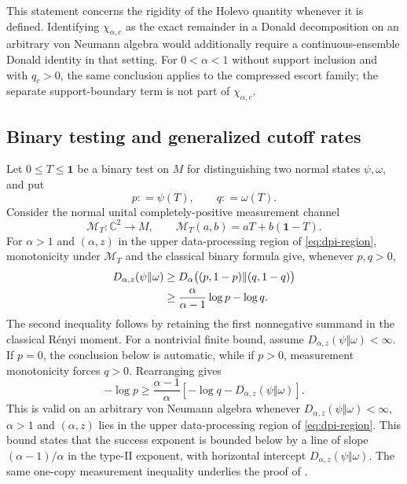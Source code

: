 \documentclass[12pt]{article}
\numberwithin{equation}{section}
\theoremstyle{definition}
\theoremstyle{remark}
\newcommand{\one}{\mathbf 1}
\newcommand{\?}{\overset{?}{=}}
\newcommand{\defeq}{\mathrel{\mathop:}=}
\begin{document}
This statement concerns the rigidity of the Holevo quantity whenever it is
defined.  Identifying \(\chi_{\alpha,c}\) as the exact remainder in a Donald
decomposition on an arbitrary von Neumann algebra would additionally require
a continuous-ensemble Donald identity in that setting.  For
\(0<\alpha<1\) without support inclusion and with \(q_c>0\), the same conclusion applies to the
compressed escort family; the separate support-boundary term is not part of
\(\chi_{\alpha,c}\).
 

\subsection{Binary testing and generalized cutoff rates}
\label{subsec:binary-testing}
Let $0\leq T\leq\one$ be a binary test on $M$ for distinguishing two
normal states $\psi,\omega$, and put
\begin{equation}
  p\defeq \psi(T),\qquad q\defeq \omega(T).
\end{equation}
Consider the normal unital completely-positive measurement channel
\begin{equation}
    \mathcal{M}_T:\mathbb{C}^2\to M,\qquad \mathcal{M}_T(a,b)=aT+b(\one-T).
\end{equation}
For $\alpha>1$ and $(\alpha,z)$ in the upper data-processing region of
\eqref{eq:dpi-region}, monotonicity under $\mathcal{M}_T$ and the classical binary
formula give, whenever $p,q>0$,
\begin{align}
  D_{\alpha,z}(\psi\Vert\omega)
  &\geq D_\alpha\bigl((p,1-p)\Vert(q,1-q)\bigr)\notag\\
  &\geq\frac{\alpha}{\alpha-1}\log p-\log q.
  \label{eq:one-shot-testing-derivation}
\end{align}
The second inequality follows by retaining the first nonnegative summand
in the classical R\'enyi moment.  For a nontrivial finite bound, assume
$D_{\alpha,z}(\psi\Vert\omega)<\infty$.  If $p=0$, the conclusion below
is automatic, while if $p>0$, measurement monotonicity forces $q>0$.
Rearranging gives
\begin{equation}
  -\log p
  \geq\frac{\alpha-1}{\alpha}
  \left[-\log q-D_{\alpha,z}(\psi\Vert\omega)\right].
  \label{eq:one-shot-testing-bound}
\end{equation}
This is valid on an arbitrary von Neumann algebra whenever $D_{\alpha,z}(\psi\Vert\omega)<\infty$,
$\alpha>1$ and $(\alpha,z)$ lies in the upper data-processing region
of \eqref{eq:dpi-region}. This bound states that the success
exponent is bounded below by a line of slope
\((\alpha-1)/\alpha\) in the type-II exponent, with horizontal
intercept \(D_{\alpha,z}(\psi\Vert\omega)\).  
The same one-copy measurement inequality underlies the proof of \cite[Lemma~IV.7]{Mosonyi:2014wsq}.   
\end{document}
